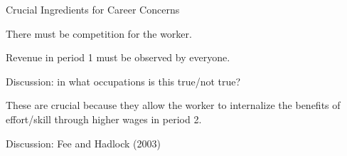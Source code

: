 \documentclass[aspectratio=169,usenames,dvipsnames]{beamer}
\newenvironment{wideitemize}{\itemize\addtolength{\itemsep}{10pt}}{\enditemize}
\begin{document}
\begin{frame}{Crucial Ingredients for Career Concerns}

\begin{wideitemize}
    \item There must be competition for the worker.
    \item Revenue in period 1 must be observed by everyone.
    \item Discussion: in what occupations is this true/not true?
    \item These are crucial because they allow the worker to internalize the benefits of effort/skill through higher wages in period 2.
\end{wideitemize}
    
\end{frame}


\begin{frame}
\centering
    \huge Discussion: Fee and Hadlock (2003)

\end{frame}
\end{document}
